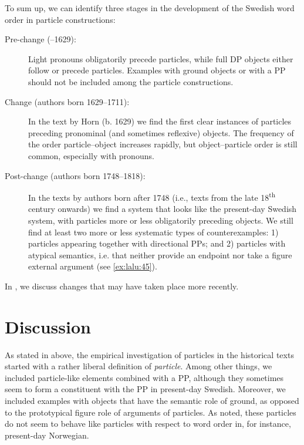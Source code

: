 \documentclass[output=paper]{langscibook}
\begin{document}
To sum up, we can identify three stages in the development of the Swedish word order in particle constructions:


\begin{description}
\item[Pre-change (–1629):] Light pronouns obligatorily precede particles, while full DP objects either follow or precede particles. Examples with ground objects or with a PP should not be included among the particle constructions.
\item[Change (authors born 1629–1711):] In the text by Horn (b. 1629) we find the first clear instances of particles preceding pronominal (and sometimes reflexive) objects. The frequency of the order particle--object increases rapidly, but object–particle order is still common, especially with pronouns.
\item[Post-change (authors born 1748–1818):] In the texts by authors born after 1748 (i.e., texts from the late 18\textsuperscript{th} century onwards) we find a system that looks like the present-day Swedish system, with particles more or less obligatorily preceding objects. We still find at least two more or less systematic types of counterexamples: 1) particles appearing together with directional PPs; and 2) particles with atypical semantics, i.e. that neither provide an endpoint nor take a figure external argument (see \ref{ex:lalu:45}).
\end{description}

In , we discuss changes that may have taken place more recently.


\section{Discussion}\label{sec:lalu:6}


As stated in  above, the empirical investigation of particles in the historical texts started with a rather liberal definition of \textit{particle}. Among other things, we included particle-like elements combined with a PP, although they sometimes seem to form a constituent with the PP in present-day Swedish. Moreover, we included examples with objects that have the semantic role of ground, as opposed to the prototypical figure role of arguments of particles. As noted, these particles do not seem to behave like particles with respect to word order in, for instance, present-day Norwegian.
\end{document}
